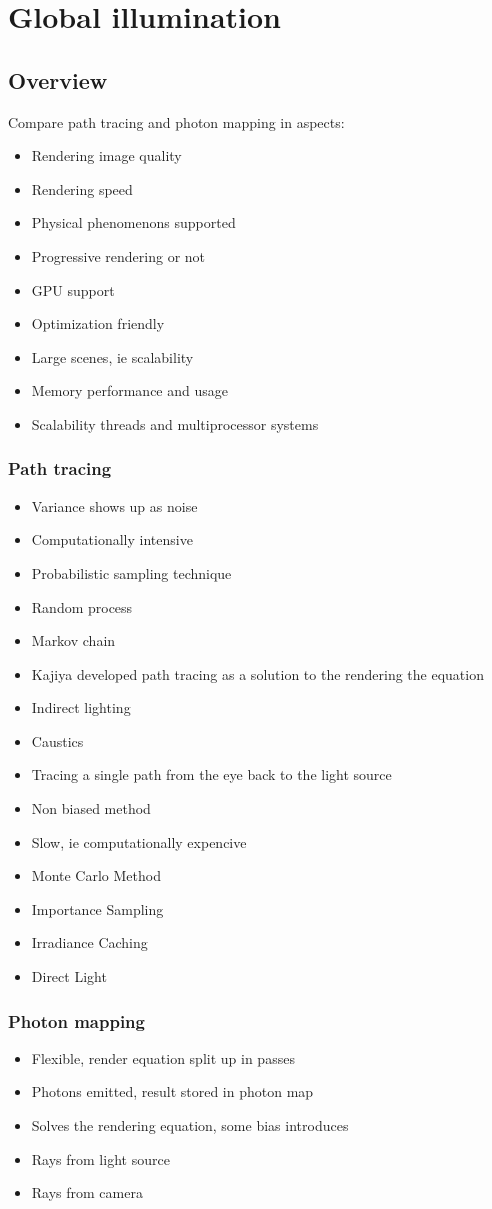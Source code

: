 \chapter{Global illumination}
\section{Overview}
Compare path tracing and photon mapping in aspects:
\begin{itemize}
\item Rendering image quality
\item Rendering speed
\item Physical phenomenons supported
\item Progressive rendering or not
\item GPU support
\item Optimization friendly
\item Large scenes, ie scalability
\item Memory performance and usage
\item Scalability threads and multiprocessor systems
\end{itemize}
\subsection{Path tracing}
\begin{itemize}
\item Variance shows up as noise
\item Computationally intensive
\item Probabilistic sampling technique
\item Random process
\item Markov chain
\item Kajiya developed path tracing as a solution to the rendering the equation
\item Indirect lighting
\item Caustics
\item Tracing a single path from the eye back to the light source
\item Non biased method
\item Slow, ie computationally expencive
\item Monte Carlo Method
\item Importance Sampling
\item Irradiance Caching
\item Direct Light
\end{itemize}
\subsection{Photon mapping}
\begin{itemize}
\item Flexible, render equation split up in passes
\item Photons emitted, result stored in photon map
\item Solves the rendering equation, some bias introduces
\item Rays from light source
\item Rays from camera
\end{itemize}
